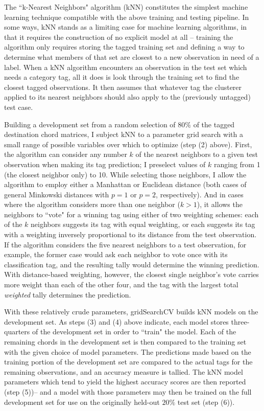 The ``k-Nearest Neighbors" algorithm (kNN) constitutes the simplest machine learning technique compatible with the above training and testing pipeline.  In some ways, kNN stands as a limiting case for machine learning algorithms, in that it requires the construction of no explicit model at all -- training the algorithm only requires storing the tagged training set and defining a way to determine what members of that set are closest to a new observation in need of a label.  When a kNN algorithm encounters an observation in the test set which needs a category tag, all it does is look through the training set to find the closest tagged observations.  It then assumes that whatever tag the clusterer applied to its nearest neighbors should also apply to the (previously untagged) test case.

Building a development set from a random selection of $80\%$ of the tagged destination chord matrices, I subject kNN to a parameter grid search with a small range of possible variables over which to optimize (step (2) above).  First, the algorithm can consider any number $k$ of the nearest neighbors to a given test observation when making its tag prediction; I preselect values of $k$ ranging from 1 (the closest neighbor only) to 10.  While selecting those neighbors, I allow the algorithm to employ either a Manhattan or Euclidean distance (both cases of general Minkowski distances with $p=1$ or $p=2$, respectively).  And in cases where the algorithm considers more than one neighbor ($k>1$), it allows the neighbors to ``vote" for a winning tag using either of two weighting schemes: each of the $k$ neighbors suggests its tag with equal weighting, or each suggests its tag with a weighting inversely proportional to its distance from the test observation.  If the algorithm considers the five nearest neighbors to a test observation, for example, the former case would ask each neighbor to vote once with its classification tag, and the resulting tally would determine the winning prediction.  With distance-based weighting, however, the closest single neighbor's vote carries more weight than each of the other four, and the tag with the largest total \emph{weighted} tally determines the prediction.

With these relatively crude parameters, gridSearchCV builds kNN models on the development set.  As steps (3) and (4) above indicate, each model stores three-quarters of the development set in order to ``train" the model.  Each of the remaining chords in the development set is then compared to the training set with the given choice of model parameters.  The predictions made based on the training portion of the development set are compared to the actual tags for the remaining observations, and an accuracy measure is tallied.  The kNN model parameters which tend to yield the highest accuracy scores are then reported (step (5))-- and a model with those parameters may then be trained on the full development set for use on the originally held-out $20\%$ test set (step (6)).

